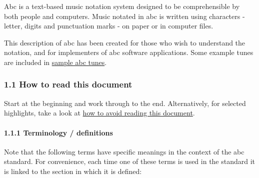 \documentclass[oneside]{book}
\let\oldparagraph\paragraph
\renewcommand{\paragraph}[1]{\oldparagraph{#1}\mbox{}}
\begin{document}
Abc is a text-based music notation system designed to be comprehensible
by both people and computers. Music notated in abc is written using
characters - letter, digits and punctuation marks - on paper or in
computer files.

This description of abc has been created for those who wish to
understand the notation, and for implementers of abc software
applications. Some example tunes are included in
\protect\hyperlink{sample_abc_tunes}{sample abc tunes}.

\hypertarget{how_to_read_this_document}{\subsubsection{1.1 How to read
this document}\label{how_to_read_this_document}}

Start at the beginning and work through to the end. Alternatively, for
selected highlights, take a look at
\protect\hyperlink{how_to_avoid_reading_this_document}{how to avoid
reading this document}.

\hypertarget{terminology_definitions}{\paragraph{1.1.1 Terminology /
definitions}\label{terminology_definitions}}

Note that the following terms have specific meanings in the context of
the abc standard. For convenience, each time one of these terms is used
in the standard it is linked to the section in which it is defined:
\end{document}
